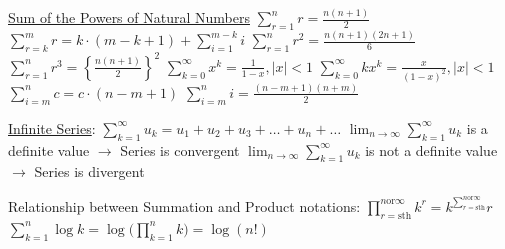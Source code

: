 \documentclass[12pt]{article}
\begin{document}
\begin{flushleft}
	\uline{Sum of the Powers of Natural Numbers} \linebreak 
	\textbullet \quad $\displaystyle \sum \limits_{r=1}^n r = \frac{n(n+1)}{2} $ \linebreak 
	\textbullet \quad $\displaystyle \sum \limits_{r=k}^m r = k \cdot (m - k + 1) + \sum \limits_{i=1}^{m-k} i $ \linebreak 
	\textbullet \quad $\displaystyle \sum \limits_{r=1}^n r^2 = \frac{n(n+1)(2n+1)}{6} $ \linebreak 
	\textbullet \quad $\displaystyle \sum \limits_{r=1}^n r^3 = \left\{ \frac{n(n+1)}{2} \right\}^2 $ \linebreak 
	\textbullet \quad $\displaystyle \sum \limits_{k=0}^\infty x^k= \frac{1}{1-x}, |x| < 1 $ \linebreak 
	\textbullet \quad $\displaystyle \sum \limits_{k=0}^\infty kx^k= \frac{x}{(1-x)^2}, |x| < 1 $ \linebreak 
	\textbullet \quad $\displaystyle \sum \limits_{i=m}^n c = c \cdot (n - m + 1) $ \linebreak 
	\textbullet \quad $\displaystyle \sum \limits_{i=m}^n i = \frac{(n-m+1)(n+m)}{2} $ \linebreak 
	
	\uline{Infinite Series}: $\displaystyle \sum \limits_{k=1}^{\infty} u_k = u_1 +u_2 +u_3 + \ldots + u_n + \ldots $ \linebreak 
	\textbullet \quad  $\lim_{n\to\infty} \sum \limits_{k=1}^{\infty} u_k $ is a definite value $\rightarrow$ Series is convergent \linebreak 
	\textbullet \quad $ \lim_{n\to\infty} \sum \limits_{k=1}^{\infty} u_k $ is not a definite value $\rightarrow$ Series is divergent \linebreak 
	
	Relationship between Summation and Product notations: \linebreak 
	$\displaystyle \prod \limits_{r=\text{sth}}^{n \text{or} \infty} k^r = k^{\sum \limits_{r=\text{sth}}^{n \text{or} \infty}} r$ \linebreak 
	$\displaystyle \sum \limits_{k=1}^n \log k = \log \bigg( \prod \limits_{k=1}^n k \bigg) = \log (n!) $ \linebreak 
	

\end{flushleft}
\end{document}
